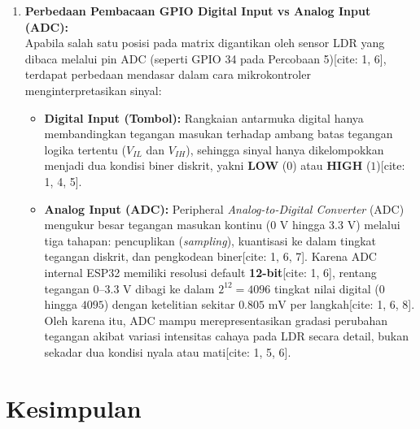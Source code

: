 \begin{enumerate}
    \item \textbf{Perbedaan Pembacaan GPIO Digital Input vs Analog Input (ADC):} \\
    Apabila salah satu posisi pada matrix digantikan oleh sensor LDR yang dibaca melalui pin ADC (seperti GPIO 34 pada Percobaan 5)[cite: 1, 6], terdapat perbedaan mendasar dalam cara mikrokontroler menginterpretasikan sinyal:
    \begin{itemize}
        \item \textbf{Digital Input (Tombol):} Rangkaian antarmuka digital hanya membandingkan tegangan masukan terhadap ambang batas tegangan logika tertentu ($V_{IL}$ dan $V_{IH}$), sehingga sinyal hanya dikelompokkan menjadi dua kondisi biner diskrit, yakni \textbf{LOW} ($0$) atau \textbf{HIGH} ($1$)[cite: 1, 4, 5].
        \item \textbf{Analog Input (ADC):} Peripheral \textit{Analog-to-Digital Converter} (ADC) mengukur besar tegangan masukan kontinu ($0\text{ V}$ hingga $3.3\text{ V}$) melalui tiga tahapan: pencuplikan (\textit{sampling}), kuantisasi ke dalam tingkat tegangan diskrit, dan pengkodean biner[cite: 1, 6, 7]. Karena ADC internal ESP32 memiliki resolusi default \textbf{12-bit}[cite: 1, 6], rentang tegangan $0\text{--}3.3\text{ V}$ dibagi ke dalam $2^{12} = 4096$ tingkat nilai digital ($0$ hingga $4095$) dengan ketelitian sekitar $0.805\text{ mV}$ per langkah[cite: 1, 6, 8]. Oleh karena itu, ADC mampu merepresentasikan gradasi perubahan tegangan akibat variasi intensitas cahaya pada LDR secara detail, bukan sekadar dua kondisi nyala atau mati[cite: 1, 5, 6].
    \end{itemize}
\end{enumerate}

\section{Kesimpulan}

